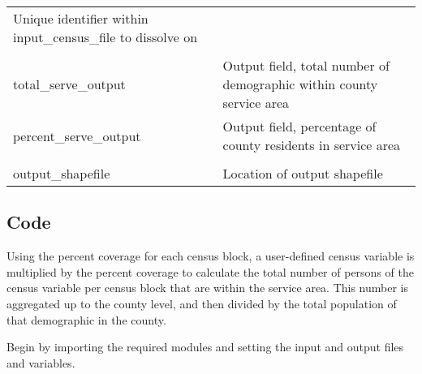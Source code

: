 \documentclass[11pt,]{article}
\begin{document}
\begin{longtable}[]{@{}ll@{}}
\begin{minipage}[t]{0.71\columnwidth}
Unique identifier within input\_census\_file to dissolve on\strut
\end{minipage}\tabularnewline
\begin{minipage}[t]{0.23\columnwidth}\raggedright\strut
\strut
\end{minipage}\tabularnewline
\begin{minipage}[t]{0.23\columnwidth}\raggedright\strut
total\_serve\_output\strut
\end{minipage} & \begin{minipage}[t]{0.71\columnwidth}\raggedright\strut
Output field, total number of demographic within county service
area\strut
\end{minipage}\tabularnewline
\begin{minipage}[t]{0.23\columnwidth}\raggedright\strut
percent\_serve\_output\strut
\end{minipage} & \begin{minipage}[t]{0.71\columnwidth}\raggedright\strut
Output field, percentage of county residents in service area\strut
\end{minipage}\tabularnewline
\begin{minipage}[t]{0.23\columnwidth}\raggedright\strut
\strut
\end{minipage}\tabularnewline
\begin{minipage}[t]{0.23\columnwidth}\raggedright\strut
output\_shapefile\strut
\end{minipage} & \begin{minipage}[t]{0.71\columnwidth}\raggedright\strut
Location of output shapefile\strut
\end{minipage}\tabularnewline
\bottomrule
\end{longtable}

\subsection{Code}\label{code-2}

\noindent Using the percent coverage for each census block, a
user-defined census variable is multiplied by the percent coverage to
calculate the total number of persons of the census variable per census
block that are within the service area. This number is aggregated up to
the county level, and then divided by the total population of that
demographic in the county. \vspace{3mm}

\noindent Begin by importing the required modules and setting the input
and output files and variables.
\end{document}
